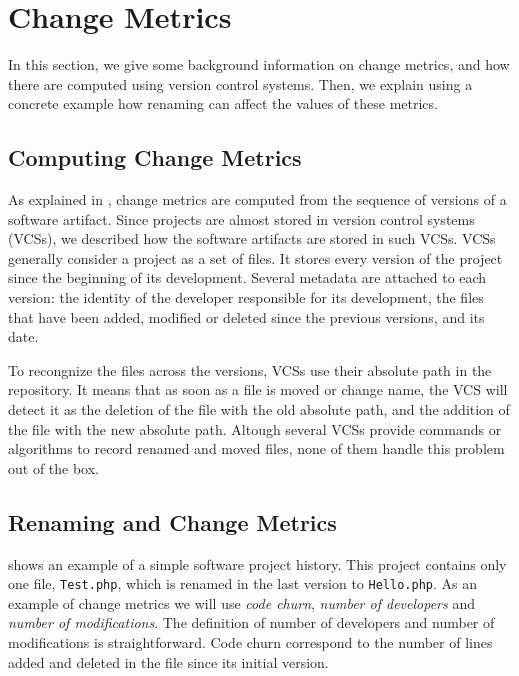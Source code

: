\section{Change Metrics}
\label{sec:changemetrics}

In this section, we give some background information on change metrics, and how there are computed using version control systems. Then, we explain using a concrete example how renaming can affect the values of these metrics.

\subsection{Computing Change Metrics}

As explained in , change metrics are computed from the sequence of versions of a software artifact. Since projects are almost stored in version control systems (VCSs), we described how the software artifacts are stored in such VCSs. VCSs generally consider a project as a set of files. It stores every version of the project since the beginning of its development. Several metadata are attached to each version: the identity of the developer responsible for its development, the files that have been added, modified or deleted since the previous versions, and its date.

To recongnize the files across the versions, VCSs use their absolute path in the repository. It means that as soon as a file is moved or change name, the VCS will detect it as the deletion of the file with the old absolute path, and the addition of the file with the new absolute path. Altough several VCSs provide commands or algorithms to record renamed and moved files, none of them handle this problem out of the box. 

\subsection{Renaming and Change Metrics}

 shows an example of a simple software project history. This project contains only one file, \texttt{Test.php}, which is renamed in the last version to \texttt{Hello.php}. As an example of change metrics we will use \emph{code churn}, \emph{number of developers} and \emph{number of modifications}. The definition of number of developers and number of modifications is straightforward. Code churn correspond to the number of lines added and deleted in the file since its initial version.

